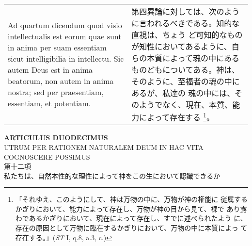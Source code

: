 \documentclass[10pt]{jsarticle} %
\begin{document}
\begin{longtable}{p{21em}p{21em}}
\\

{\sc Ad quartum dicendum} quod visio intellectualis est eorum quae
sunt in anima per suam essentiam sicut intelligibilia in
intellectu. Sic autem Deus est in anima beatorum, non autem in anima
nostra; sed per praesentiam, essentiam, et potentiam.

&

第四異論に対しては、次のように言われるべきである。知的な直視は、ちょう
ど可知的なものが知性においてあるように、自らの本質によって魂の中にある
ものどもについてある。神は、そのように、至福者の魂の中にあるが、私達の
魂の中には、そのようでなく、現在、本質、能力によって存在する
\footnote{「それゆえ、このようにして、神は万物の中に、万物が神の権能に
従属するかぎりにおいて、能力によって存在し、万物が神の目から見て、裸で
あり露わであるかぎりにおいて、現在によって存在し、すでに述べられたよう
に、存在の原因として万物に臨在するかぎりにおいて、万物の中に本質によっ
て存在する。」({\it ST} I, q.8, a.3, c.)}。

\end{longtable}

\newpage
{}

\begin{center}
 {\Large {\bf ARTICULUS DUODECIMUS}}\\
{\large UTRUM PER RATIONEM NATURALEM DEUM IN HAC VITA\\COGNOSCERE POSSIMUS}\\
{\large 第十二項\\私たちは、自然本性的な理性によって神をこの生において認識できるか}

\end{center}
\end{document}

